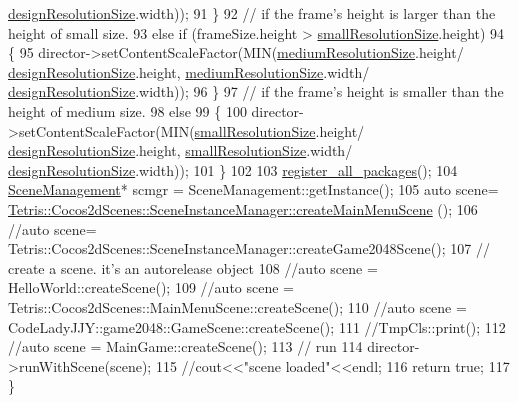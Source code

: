 \begin{DoxyCode}
      \hyperlink{_app_delegate_8cpp_a14515fff3914933cbc185cea12f1c54c}{designResolutionSize}.width));
91     \}
92     \textcolor{comment}{// if the frame's height is larger than the height of small size.}
93     \textcolor{keywordflow}{else} \textcolor{keywordflow}{if} (frameSize.height > \hyperlink{_app_delegate_8cpp_ac337c8e30d901706e0cbdd32256b7d47}{smallResolutionSize}.height)
94     \{        
95         director->setContentScaleFactor(MIN(\hyperlink{_app_delegate_8cpp_a50eb9194b9f3d6f1b94424ff16c13686}{mediumResolutionSize}.height/
      \hyperlink{_app_delegate_8cpp_a14515fff3914933cbc185cea12f1c54c}{designResolutionSize}.height, \hyperlink{_app_delegate_8cpp_a50eb9194b9f3d6f1b94424ff16c13686}{mediumResolutionSize}.width/
      \hyperlink{_app_delegate_8cpp_a14515fff3914933cbc185cea12f1c54c}{designResolutionSize}.width));
96     \}
97     \textcolor{comment}{// if the frame's height is smaller than the height of medium size.}
98     \textcolor{keywordflow}{else}
99     \{        
100         director->setContentScaleFactor(MIN(\hyperlink{_app_delegate_8cpp_ac337c8e30d901706e0cbdd32256b7d47}{smallResolutionSize}.height/
      \hyperlink{_app_delegate_8cpp_a14515fff3914933cbc185cea12f1c54c}{designResolutionSize}.height, \hyperlink{_app_delegate_8cpp_ac337c8e30d901706e0cbdd32256b7d47}{smallResolutionSize}.width/
      \hyperlink{_app_delegate_8cpp_a14515fff3914933cbc185cea12f1c54c}{designResolutionSize}.width));
101     \}
102 
103     \hyperlink{_app_delegate_8cpp_a2fe80cfe6b9fd0570db7bb3c69376873}{register\_all\_packages}();
104     \hyperlink{class_tetris_1_1_cocos2d_scenes_1_1_scene_management}{SceneManagement}* scmgr = SceneManagement::getInstance();
105     \textcolor{keyword}{auto} scene= \hyperlink{class_tetris_1_1_cocos2d_scenes_1_1_scene_instance_manager_a7dad1373db969d5c882e2cdc46f7933a}{Tetris::Cocos2dScenes::SceneInstanceManager::createMainMenuScene}
      ();
106     \textcolor{comment}{//auto scene= Tetris::Cocos2dScenes::SceneInstanceManager::createGame2048Scene();}
107     \textcolor{comment}{// create a scene. it's an autorelease object}
108     \textcolor{comment}{//auto scene = HelloWorld::createScene();}
109     \textcolor{comment}{//auto scene = Tetris::Cocos2dScenes::MainMenuScene::createScene();}
110     \textcolor{comment}{//auto scene = CodeLadyJJY::game2048::GameScene::createScene();}
111     \textcolor{comment}{//TmpCls::print();}
112     \textcolor{comment}{//auto scene = MainGame::createScene();}
113     \textcolor{comment}{// run}
114     director->runWithScene(scene);
115     \textcolor{comment}{//cout<<"scene loaded"<<endl;}
116     \textcolor{keywordflow}{return} \textcolor{keyword}{true};
117 \}
\end{DoxyCode}
